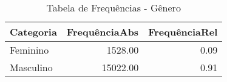 \begin{table}[ht]
\centering
\begin{tabular}{lrr}
  \hline
Categoria & FrequênciaAbs & FrequênciaRel \\ 
  \hline
Feminino & 1528.00 & 0.09 \\ 
  Masculino & 15022.00 & 0.91 \\ 
   \hline
\end{tabular}
\caption{Tabela de Frequências - Gênero} 
\end{table}
